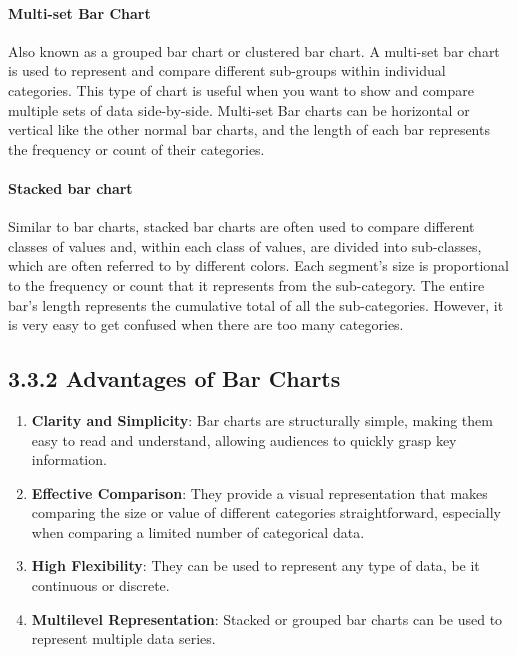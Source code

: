 \documentclass{article}\usepackage[]{graphicx}\usepackage[]{xcolor}
\begin{document}
\paragraph{Multi-set Bar Chart}
Also known as a grouped bar chart or clustered bar chart. A multi-set bar chart is used to represent and compare different sub-groups within individual categories. This type of chart is useful when you want to show and compare multiple sets of data side-by-side.
Multi-set Bar charts can be horizontal or vertical like the other normal bar charts, and the length of each bar represents the frequency or count of their categories.
\paragraph{Stacked bar chart}
Similar to bar charts, stacked bar charts are often used to compare different classes of values and, within each class of values, are divided into sub-classes, which are often referred to by different colors. Each segment's size is proportional to the frequency or count that it represents from the sub-category. The entire bar's length represents the cumulative total of all the sub-categories.
However, it is very easy to get confused when there are too many categories.

\subsection*{3.3.2 Advantages of Bar Charts}
\begin{enumerate}
\item \textbf{Clarity and Simplicity}: Bar charts are structurally simple, making them easy to read and understand, allowing audiences to quickly grasp key information.
    
    \item \textbf{Effective Comparison}: They provide a visual representation that makes comparing the size or value of different categories straightforward, especially when comparing a limited number of categorical data.
    
    \item \textbf{High Flexibility}: They can be used to represent any type of data, be it continuous or discrete.
    
    \item \textbf{Multilevel Representation}: Stacked or grouped bar charts can be used to represent multiple data series.
\end{enumerate}
\end{document}
